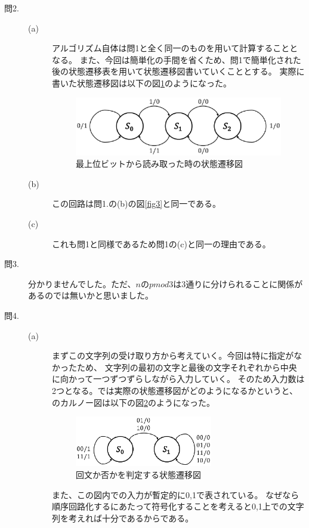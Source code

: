 \documentclass{jsarticle}
\begin{document}
\begin{description}
        \item[問2.]
        \begin{description}
            \item[(a)]
            アルゴリズム自体は問1と全く同一のものを用いて計算することとなる。
            また、今回は簡単化の手間を省くため、問1で簡単化された後の状態遷移表を用いて状態遷移図書いていくこととする。
            実際に書いた状態遷移図は以下の図\ref{fig4}のようになった。
            \begin{figure}[H]
                \centering
                \includegraphics[width = 10cm]{fig_4.eps}
                \caption{最上位ビットから読み取った時の状態遷移図}
                \label{fig4}
            \end{figure}

            \item[(b)]
            この回路は問1.の(b)の図\ref{fig3}と同一である。

            \item[(c)]
            これも問1と同様であるため問1の(c)と同一の理由である。
        \end{description}

        \item[問3.]
        分かりませんでした。ただ、$n$の$pmod 3$は3通りに分けられることに関係があるのでは無いかと思いました。

        \item[問4.]
        \begin{description}
            \item[(a)]
            まずこの文字列の受け取り方から考えていく。今回は特に指定がなかったため、
            文字列の最初の文字と最後の文字それぞれから中央に向かって一つずつずらしながら入力していく。
            そのため入力数は2つとなる。では実際の状態遷移図がどのようになるかというと、のカルノー図は以下の図\ref{fig5}のようになった。
            \begin{figure}[H]
                \centering
                \includegraphics[width=6cm]{fig_5.eps}
                \caption{回文か否かを判定する状態遷移図}
                \label{fig5}
            \end{figure}
            また、この図内での入力が暫定的に0,1で表されている。
            なぜなら順序回路化するにあたって符号化することを考えると0,1上での文字列を考えれば十分であるからである。


\end{description}
\end{description}
\end{document}
